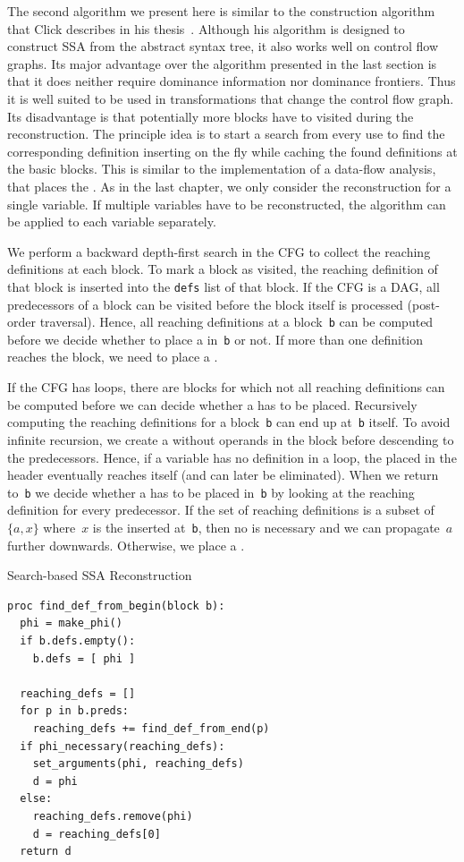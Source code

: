 The second algorithm we present here is similar to the construction algorithm that Click describes in his thesis~\cite{click:thesis}.
Although his algorithm is designed to construct SSA from the abstract syntax tree, it also works well on control flow graphs.
Its major advantage over the algorithm presented in the last section is that it does neither require dominance information nor dominance frontiers.
Thus it is well suited to be used in transformations that change the control flow graph.
Its disadvantage is that potentially more blocks have to visited during the reconstruction.
The principle idea is to start a search from every use to find the corresponding definition inserting \phifuns on the fly while caching the found definitions at the basic blocks.
This is similar to the implementation of a data-flow analysis, that places the \phifuns.
As in the last chapter, we only consider the reconstruction for a single variable.
If multiple variables have to be reconstructed, the algorithm can be applied to each variable separately.

We perform a backward depth-first search in the CFG to collect the reaching definitions at each block. 
To mark a block as visited, the reaching definition of that block is inserted into the \verb|defs| list of that block.
If the CFG is a DAG, all predecessors of a block can be visited before the block itself is processed (post-order traversal).
Hence, all reaching definitions at a block~\verb|b| can be computed before we decide whether to place a \phifun in~\verb|b| or not.
If more than one definition reaches the block, we need to place a \phifun.

If the CFG has loops, there are blocks for which not all reaching definitions can be computed before we can decide whether a \phifun has to be placed.
Recursively computing the reaching definitions for a block~\verb|b| can end up at~\verb|b| itself.
To avoid infinite recursion, we create a \phifun without operands in the block before descending to the predecessors. 
Hence, if a variable has no definition in a loop, the \phifun placed in the header eventually reaches itself (and can later be eliminated). 
When we return to~\verb|b| we decide whether a \phifun has to be placed in~\verb|b| by looking at the reaching definition for every predecessor.
If the set of reaching definitions is a subset of $\{a,x\}$ where~$x$ is the \phifun inserted at~\verb|b|, then no \phifun is necessary and we can propagate~$a$ further downwards. 
Otherwise, we place a \phifun.

\begin{algorithm}
	\caption{Search-based SSA Reconstruction}
	\label{alg:ssaconstr_click}

\begin{verbatim}
proc find_def_from_begin(block b):
  phi = make_phi()
  if b.defs.empty():
    b.defs = [ phi ] 

  reaching_defs = []
  for p in b.preds:
    reaching_defs += find_def_from_end(p)
  if phi_necessary(reaching_defs):
    set_arguments(phi, reaching_defs)
    d = phi
  else:
    reaching_defs.remove(phi)
    d = reaching_defs[0]
  return d
\end{verbatim}
\end{algorithm}

